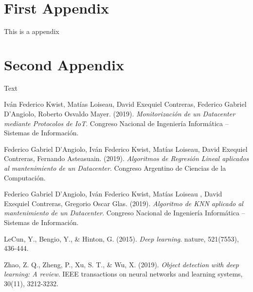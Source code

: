 \documentclass{article} %
\begin{document}
\section{First Appendix}\label{app:one}

This is a appendix

\cleardoublepage

\section{Second Appendix}\label{app:two}

Text

\cleardoublepage

\begin{thebibliography}{9}

Iván Federico Kwist, Matías Loiseau, David Exequiel Contreras, Federico Gabriel D’Angiolo,  Roberto Osvaldo Mayer. (2019). \textit{Monitorización de un Datacenter mediante Protocolos de IoT}. Congreso Nacional de Ingeniería Informática – Sistemas de Información.

Federico Gabriel D’Angiolo, Iván Federico Kwist, Matías Loiseau, David Exequiel Contreras, Fernando Asteasuain. (2019). \textit{Algoritmos de Regresión Lineal aplicados al mantenimiento de un Datacenter}. Congreso Argentino de Ciencias de la Computación.

Federico Gabriel D’Angiolo, Iván Federico Kwist, Matías Loiseau , David Exequiel Contreras, Gregorio Oscar Glas. (2019). \textit{Algoritmo de KNN aplicado al mantenimiento de un Datacenter}. Congreso Nacional de Ingeniería Informática – Sistemas de Información.

LeCun, Y., Bengio, Y., \& Hinton, G. (2015). \textit{Deep learning}. nature, 521(7553), 436-444.

Zhao, Z. Q., Zheng, P., Xu, S. T., \& Wu, X. (2019). \textit{Object detection with deep learning: A review}. IEEE transactions on neural networks and learning systems, 30(11), 3212-3232.

\end{thebibliography}
\end{document}

